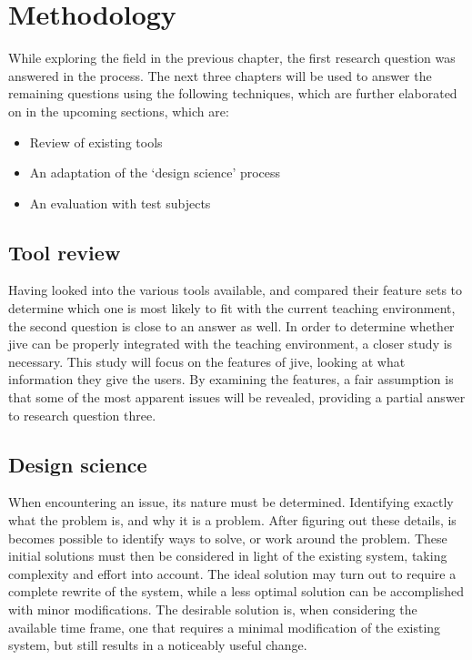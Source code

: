 \chapter{Methodology}\label{methodology}

While exploring the field in the previous chapter, the first research question was answered in the process.
The next three chapters will be used to answer the remaining questions using the following techniques, which are further elaborated on in the upcoming sections, which are:

\begin{itemize}
	\item{Review of existing tools}
	\item{An adaptation of the `design science' process}%
	\item{An evaluation with test subjects}
\end{itemize}

\section{Tool review}\label{methReview}

Having looked into the various tools available, and compared their feature sets to determine which one is most likely to fit with the current teaching environment, the second question is close to an answer as well.
In order to determine whether \gls{jive} can be properly integrated with the teaching environment, a closer study is necessary.
This study will focus on the features of \gls{jive}, looking at what information they give the users.
By examining the features, a fair assumption is that some of the most apparent issues will be revealed, providing a partial answer to research question three.

\section{Design science}\label{methDesign}


When encountering an issue, its nature must be determined.
Identifying exactly what the problem is, and why it is a problem.
After figuring out these details, is becomes possible to identify ways to solve, or work around the problem.
These initial solutions must then be considered in light of the existing system, taking complexity and effort into account.
The ideal solution may turn out to require a complete rewrite of the system, while a less optimal solution can be accomplished with minor modifications.
The desirable solution is, when considering the available time frame, one that requires a minimal modification of the existing system, but still results in a noticeably useful change.


